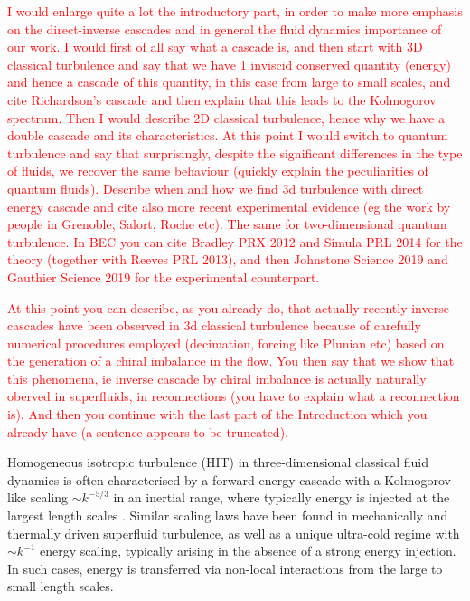 \documentclass[%
 reprint,
 amsmath,amssymb,
 aps,
 prl,
]{revtex4-2}
\def\red#1{\textcolor{red}{#1}}
\begin{document}
\red{I would enlarge quite a lot the introductory part, in order to make more emphasis on the direct-inverse cascades and in general the fluid dynamics importance of our work. I would first of all say what a cascade is, and then start with 3D classical turbulence and say that we have 1 inviscid conserved quantity (energy) and hence a cascade of this quantity, in this case from large to small scales, and cite Richardson's cascade and then explain that this leads to the Kolmogorov spectrum. Then I would describe 2D classical turbulence, hence why we have a double cascade and its characteristics.}
%
\red{
At this point I would switch to quantum turbulence and say that surprisingly, despite the significant differences in the type of fluids, we recover the same behaviour (quickly explain the peculiarities of quantum fluids). Describe when and how we find 3d turbulence with direct energy cascade and cite also more recent experimental evidence (eg the work by people in Grenoble, Salort, Roche etc). The same for two-dimensional quantum turbulence. In BEC you can cite Bradley PRX 2012 and Simula PRL 2014  for the theory (together with Reeves PRL 2013), and then Johnstone Science 2019 and Gauthier Science 2019 for the experimental counterpart. }

\red{
At this point you can describe, as you already do, that actually recently inverse cascades have been observed in 3d classical turbulence because of carefully numerical procedures employed (decimation, forcing like Plunian etc) based on the generation of a chiral imbalance in the flow. You then say that we show that this phenomena, ie inverse cascade by chiral imbalance is actually naturally oberved in superfluids, in reconnections (you have to explain what a reconnection is). And then you continue with the last part of the Introduction which you already have (a sentence appears to be truncated).}


Homogeneous isotropic turbulence (HIT) in three-dimensional classical fluid dynamics is often characterised by a forward energy cascade with a Kolmogorov-like scaling $\sim k^{-5/3}$ in an inertial range, where typically energy is injected at the largest length scales \cite{frisch1995}. Similar scaling laws have been found in mechanically \cite{maurer1998,baggaley2012} and thermally \cite{sherwin-robson2015} driven superfluid turbulence, as well as a unique ultra-cold regime with $\sim k^{-1}$ energy scaling, typically arising in the absence of a strong energy injection. In such cases, energy is transferred via non-local interactions from the large to small length scales.
\end{document}
